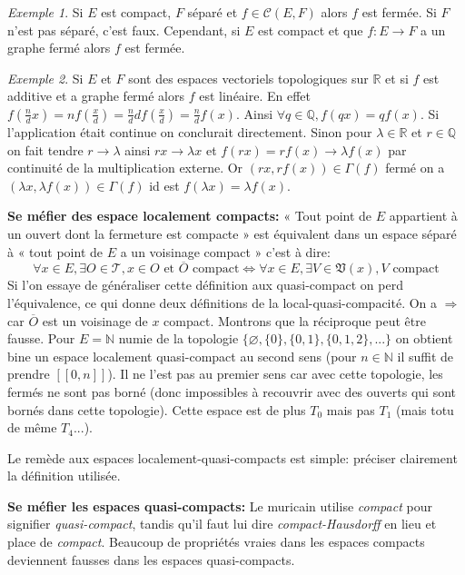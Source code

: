 \documentclass[a4paper, 11pt, french]{book}
\theoremstyle{plain} %
\theoremstyle{definition} %
\theoremstyle{remark} %
\newtheorem{exemple}{Exemple}
\newcommand{\1}{\mathds{1}}
\newcommand\vide{\varnothing}
\newcommand{\cont}{\mathcal{C}}
\newcommand\et{\text{ et }}
\newcommand{\N}{\mathbb{N}}
\newcommand{\Q}{\mathbb{Q}}
\newcommand{\R}{\mathbb{R}}
\newcommand\intervalle[1]{[\![#1]\!]}
\begin{document}
\begin{exemple}
	Si $E$ est compact, $F$ séparé et $f\in\cont(E, F)$ alors $f$ est fermée.
	Si $F$ n'est pas séparé, c'est faux.
	Cependant, si $E$ est compact et que $f:E\rightarrow F$ a un graphe fermé alors $f$ est fermée.
\end{exemple}

\begin{exemple}
	Si $E$ et $F$ sont des espaces vectoriels topologiques sur $\R$ et si $f$ est additive et a graphe fermé alors $f$ est linéaire.
	En effet $f(\frac{n}{d}x)=nf(\frac{x}{d})=\frac{n}{d}df(\frac{x}{d})=\frac{n}{d}f(x)$.
	Ainsi $\forall q\in\Q, f(qx)=qf(x)$.
	Si l'application était continue on conclurait directement.
	Sinon pour $\lambda\in\R$ et $r\in\Q$ on fait tendre $r\rightarrow\lambda$ ainsi $rx\rightarrow\lambda x$ et $f(rx)=rf(x)\rightarrow\lambda f(x)$ par continuité de la multiplication externe.
	Or $(rx, rf(x))\in\Gamma(f)$ fermé on a $(\lambda x, \lambda f(x))\in\Gamma(f)$ id est $f(\lambda x)=\lambda f(x)$.
\end{exemple}

\textbf{Se méfier des espace localement compacts:}
« Tout point de $E$ appartient à un ouvert dont la fermeture est compacte » est équivalent dans un espace séparé à « tout point de $E$ a un voisinage compact » c'est à dire:
$$
	\forall x\in E, \exists O\in\mathscr{T}, x\in O\et\overline{O}\text{ compact}
	\iff
	\forall x\in E, \exists V\in\mathfrak{V}(x), V\text{ compact}
$$
Si l'on essaye de généraliser cette définition aux quasi-compact on perd l'équivalence, ce qui donne deux définitions de la local-quasi-compacité.
On a $\Rightarrow$ car $\overline{O}$ est un voisinage de $x$ compact.
Montrons que la réciproque peut être fausse.
Pour $E=\N$ numie de la topologie $\{\vide, \{0\}, \{0, 1\}, \{0, 1, 2\}, ...\}$ on obtient bine un espace localement quasi-compact au second sens (pour $n\in\N$ il suffit de prendre $\intervalle{0, n}$).
Il ne l'est pas au premier sens car avec cette topologie, les fermés ne sont pas borné (donc impossibles à recouvrir avec des ouverts qui sont bornés dans cette topologie).
Cette espace est de plus $T_0$ mais pas $T_1$ (mais totu de même $T_4$...).

Le remède aux espaces localement-quasi-compacts est simple: préciser clairement la définition utilisée.

\textbf{Se méfier les espaces quasi-compacts:}
Le muricain utilise \textit{compact} pour signifier \textit{quasi-compact}, tandis qu'il faut lui dire \textit{compact-Hausdorff} en lieu et place de \textit{compact}.
Beaucoup de propriétés vraies dans les espaces compacts deviennent fausses dans les espaces quasi-compacts.
\end{document}
